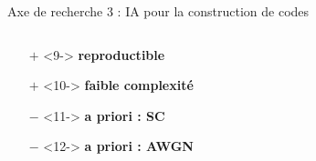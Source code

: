 \documentclass[t,compress,mathserif,12pt,xcolor=dvipsnames]{beamer}
\newcommand{\RED} [1]{\textcolor{Paired-5}{\textbf{#1}}}
\newcommand{\GREEN} [1]{\textcolor{Paired-3}{\textbf{#1}}}
\begin{document}
\begin{frame}[t]{Axe de recherche 3 : IA pour la construction de codes}
  \begin{minipage}[t][5.0cm][t]{\textwidth}
    \begin{columns}[T]
      \begin{column}{0.45\textwidth}
        \vspace*{-1.1cm}
        \begin{center}
        \end{center}
        \vspace*{-1cm}
        \small{
        \begin{itemize}
          \setlength\itemsep{-0.5em}
          \item[\GREEN{$+$}]<9-> \GREEN{reproductible}
          \item[\GREEN{$+$}]<10-> \GREEN{faible complexité}
          \item[\RED{$-$}]  <11-> \RED  {a priori : SC}
          \item[\RED{$-$}]  <12-> \RED  {a priori : AWGN}

\end{itemize}}
\end{column}
\end{columns}
\end{minipage}
\end{frame}
\end{document}
